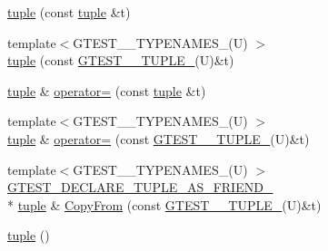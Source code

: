 \begin{DoxyCompactItemize}
\item 
\hyperlink{classstd_1_1tr1_1_1tuple_a70a4e487f56c2f544a40ca81e1b69303}{tuple} (const \hyperlink{classstd_1_1tr1_1_1tuple}{tuple} \&t)
\item 
{\footnotesize template$<$G\-T\-E\-S\-T\-\_\-\_\-\-T\-Y\-P\-E\-N\-A\-M\-E\-S\-\_\-(\-U) $>$ }\\\hyperlink{classstd_1_1tr1_1_1tuple_a3ecd978bce485352717c801af8a6e113}{tuple} (const \hyperlink{namespacestd_1_1tr1_aa636d3269bf1f368a7bc09ff158bc482}{G\-T\-E\-S\-T\-\_\-\_\-\-T\-U\-P\-L\-E\-\_\-}(U)\&t)
\item 
\hyperlink{classstd_1_1tr1_1_1tuple}{tuple} \& \hyperlink{classstd_1_1tr1_1_1tuple_a2544141b07a65060937e594228ee815a}{operator=} (const \hyperlink{classstd_1_1tr1_1_1tuple}{tuple} \&t)
\item 
{\footnotesize template$<$G\-T\-E\-S\-T\-\_\-\_\-\-T\-Y\-P\-E\-N\-A\-M\-E\-S\-\_\-(\-U) $>$ }\\\hyperlink{classstd_1_1tr1_1_1tuple}{tuple} \& \hyperlink{classstd_1_1tr1_1_1tuple_af0df06ea0529f3caa6cbbf9daaa4d341}{operator=} (const \hyperlink{namespacestd_1_1tr1_aa636d3269bf1f368a7bc09ff158bc482}{G\-T\-E\-S\-T\-\_\-\_\-\-T\-U\-P\-L\-E\-\_\-}(U)\&t)
\item 
{\footnotesize template$<$G\-T\-E\-S\-T\-\_\-\_\-\-T\-Y\-P\-E\-N\-A\-M\-E\-S\-\_\-(\-U) $>$ }\\\hyperlink{gtest-tuple_8h_a2b20671273f514a88a6e9b8328e5f257}{G\-T\-E\-S\-T\-\_\-\-D\-E\-C\-L\-A\-R\-E\-\_\-\-T\-U\-P\-L\-E\-\_\-\-A\-S\-\_\-\-F\-R\-I\-E\-N\-D\-\_\-} \\*
\hyperlink{classstd_1_1tr1_1_1tuple}{tuple} \& \hyperlink{classstd_1_1tr1_1_1tuple_aa76d0c02e6f4c6c99f32f9738623f23c}{Copy\-From} (const \hyperlink{namespacestd_1_1tr1_aa636d3269bf1f368a7bc09ff158bc482}{G\-T\-E\-S\-T\-\_\-\_\-\-T\-U\-P\-L\-E\-\_\-}(U)\&t)
\item 
\hyperlink{classstd_1_1tr1_1_1tuple_a3fb03a675507fb251c755634d9002a98}{tuple} ()
\item 

\end{DoxyCompactItemize}
